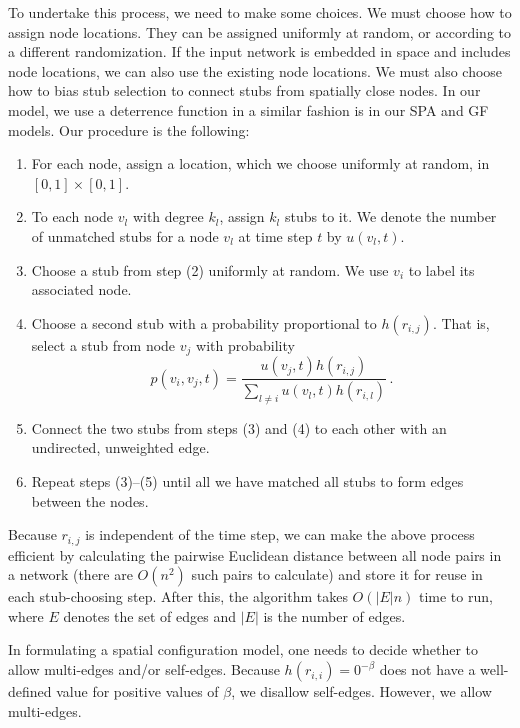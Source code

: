 \documentclass[%
 reprint,
 amsmath,amssymb,
 aps,
]{revtex4-1}
\begin{document}
To undertake this process, we need to make some choices. We must choose how to assign node locations. They can be assigned uniformly at random, or according to a different randomization. If the input network is embedded in space and includes node locations, we can also use the existing node locations. We must also choose how to bias stub selection to connect stubs from spatially close nodes. In our model, we use a deterrence function in a similar fashion is in our SPA and GF models. Our procedure is the following:
\begin{enumerate}
    \item For each node, assign a location, which we choose uniformly at random, in $[0, 1] \times [0, 1]$.
    \item To each node $v_l$ with degree $k_l$, assign $k_l$ stubs to it. We denote the number of unmatched stubs for a node $v_l$ at time step $t$ by $u(v_l, t)$.
    \item Choose a stub from step (2) uniformly at random. We use $v_i$ to label its associated node.
    \item Choose a second stub with a probability proportional to $h(r_{i,j})$. That is, select a stub from node $v_j$ with probability
   \begin{equation*}
        p(v_i, v_j, t) = \frac{u(v_j, t)h(r_{i,j})}{\sum_{l \neq i} u(v_l, t)h(r_{i,l})} \,.
    \end{equation*}
    \item Connect the two stubs from steps (3) and (4) to each other with an undirected, unweighted edge. 
    \item Repeat steps (3)--(5) until all we have matched all stubs to form edges between the nodes.
\end{enumerate}

Because $r_{i,j}$ is independent of the time step, we can make the above process 
efficient by calculating the pairwise Euclidean distance between all node pairs in a network (there are $O(n^2)$ such pairs to calculate) and store it for reuse in each stub-choosing step. After this, the algorithm takes $O(|E| n)$ time to run, where $E$ denotes the set of edges and $|E|$ is the number of edges.

In formulating a spatial configuration model, one needs to decide whether to allow multi-edges and/or self-edges. Because $h(r_{i,i}) = 0^{-\beta}$ does not have a well-defined value for positive values of $\beta$, we disallow self-edges. However, we allow multi-edges.
\end{document}
